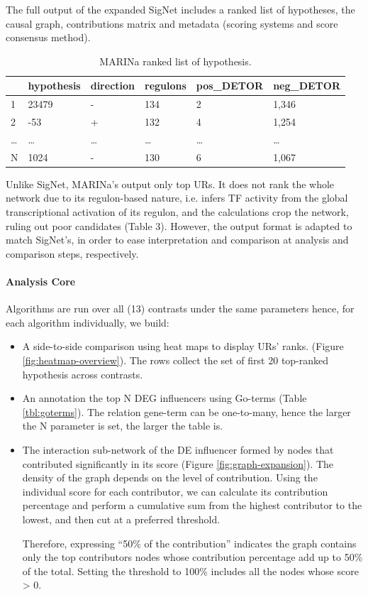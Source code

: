The full output of the expanded SigNet includes a ranked list of hypotheses, the causal graph, contributions matrix and metadata (scoring systems and score consensus method).

\begin{table}[!h]
\centering
\begin{tabular}{|l|l|l|l|l|l|}
\hline
  & hypothesis & direction & regulons & pos\_DETOR & neg\_DETOR \\ \hline
1 & 23479      & -         & 134      & 2          & 1,346      \\ \hline
2 & -53        & +         & 132      & 4          & 1,254      \\ \hline
… & …          & …         & …        & …          & …          \\ \hline
N & 1024       & -         & 130      & 6          & 1,067      \\ \hline
\end{tabular}
\caption{MARINa ranked list of hypothesis.}
\label{tbl:marina_output}
\end{table}

Unlike SigNet, MARINa’s output only top URs. It does not rank the whole network due to its regulon-based nature, i.e. infers TF activity from the global transcriptional activation of its regulon, and the calculations crop the network, ruling out poor candidates (Table 3). 
However, the output format is adapted to match SigNet’s, in order to ease interpretation and comparison at analysis and comparison steps, respectively.

\paragraph{Analysis Core}
Algorithms are run over all (13) contrasts under the same parameters hence, for each algorithm individually, we build:

\begin{itemize}
    \item A side-to-side comparison using heat maps to display URs’ ranks. (Figure \ref{fig:heatmap-overview}). The rows collect the set of first 20 top-ranked hypothesis across contrasts.
    \item An annotation the top N DEG influencers using Go-terms (Table \ref{tbl:goterms}). The relation gene-term can be one-to-many, hence the larger the N parameter is set, the larger the table is.
    \item The interaction sub-network of the DE influencer formed by nodes that contributed significantly in its score (Figure \ref{fig:graph-expansion}). The density of the graph depends on the level of contribution. Using the individual score for each contributor, we can calculate its contribution percentage and perform a cumulative sum from the highest contributor to the lowest, and then cut at a preferred threshold. 
    
    Therefore, expressing “50\% of the contribution” indicates the graph contains only the top contributors nodes whose contribution percentage add up to 50\% of the total. Setting the threshold to 100\% includes all the nodes whose score > 0.
\end{itemize}


